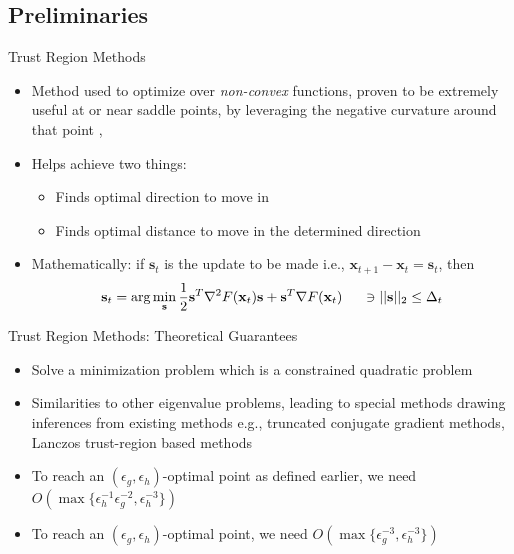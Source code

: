 \documentclass[10pt]{beamer}
\newcommand{\h}{\nabla^{2}}
\newcommand{\g}{\nabla}
\newcommand{\xbold}{\mathbf{x}}
\newcommand{\sbold}{\mathbf{s}}
\newcommand{\eg}{\epsilon_{g}}
\newcommand{\eh}{\epsilon_{h}}
\begin{document}
\subsection{Preliminaries}
\begin{frame}{Trust Region Methods}
\begin{itemize}
\item<1->{Method used to optimize over \emph{non-convex} functions, proven to be extremely useful at or near saddle points, by leveraging the negative curvature around that point \cite{conn-siam}, \cite{sorensen-siam}}
\item<2->{Helps achieve two things:
  \begin{itemize}
    \item<3->Finds optimal direction to move in
    \item<4->Finds optimal distance to move in the determined direction
  \end{itemize}
  }
\item<5->{Mathematically: if \(\sbold_{t}\) is the update to be made i.e., \(\xbold_{t+1} - \xbold_{t} = \sbold_{t}\), then
\begin{equation}
\label{TR}
\sbold_{t} = \text{arg}\min_{\sbold} \frac{1}{2}\sbold^{T} \h F(\xbold_{t}) \sbold + \sbold^{T} \g F(\xbold_{t}) \hspace{5mm}\ni ||\sbold||_{2} \leq \Delta_{t}
\end{equation} %
}
\end{itemize}
\end{frame}

\begin{frame}{Trust Region Methods: Theoretical Guarantees}
\begin{itemize}
\item<1->{Solve a minimization problem which is a constrained quadratic problem}
\item<2->{Similarities to other eigenvalue problems, leading to special methods drawing inferences from existing methods e.g., truncated conjugate gradient methods, Lanczos trust-region based methods}
\item<3->{To reach an \((\eg, \eh)\)-optimal point as defined earlier, we need \(O\left(\max\{\eh^{-1}\eg^{-2}, \eh^{-3}\}\right)\) \cite{cartis-joc}} 
\item<4->{To reach an \((\eg, \eh)\)-optimal point, we need \(O\left(\max\{\eg^{-3}, \eh^{-3}\}\right)\) \cite{geovani-oms}}
\end{itemize}
\end{frame}
\end{document}
